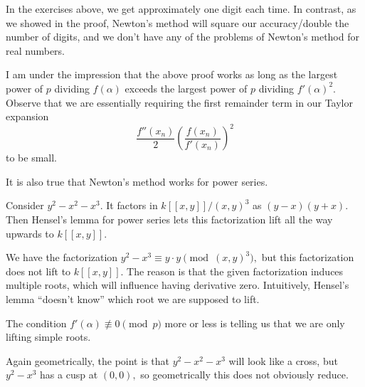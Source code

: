 \begin{remark}
	In the exercises above, we get approximately one digit each time. In contrast, as we showed in the proof, Newton's method will square our accuracy/double the number of digits, and we don't have any of the problems of Newton's method for real numbers.
\end{remark}
\begin{remark}[Nir]
	I am under the impression that the above proof works as long as the largest power of $p$ dividing $f(\alpha)$ exceeds the largest power of $p$ dividing $f'(\alpha)^2.$ Observe that we are essentially requiring the first remainder term in our Taylor expansion
	\[\frac{f''(x_n)}2\left(\frac{f(x_n)}{f'(x_n)}\right)^2\]
	to be small.
\end{remark}
It is also true that Newton's method works for power series.
\begin{example}
	Consider $y^2-x^2-x^3.$ It factors in $k[[x,y]]/(x,y)^3$ as $(y-x)(y+x).$ Then Hensel's lemma for power series lets this factorization lift all the way upwards to $k[[x,y]].$
\end{example}
\begin{nex}
	We have the factorization $y^2-x^3\equiv y\cdot y\pmod{(x,y)^3},$ but this factorization does not lift to $k[[x,y]].$ The reason is that the given factorization induces multiple roots, which will influence having derivative zero. Intuitively, Hensel's lemma ``doesn't know'' which root we are supposed to lift.
\end{nex}
\begin{remark}
	The condition $f'(\alpha)\not\equiv0\pmod p$ more or less is telling us that we are only lifting simple roots.
\end{remark}
Again geometrically, the point is that $y^2-x^2-x^3$ will look like a cross, but $y^2-x^3$ has a cusp at $(0,0),$ so geometrically this does not obviously reduce.